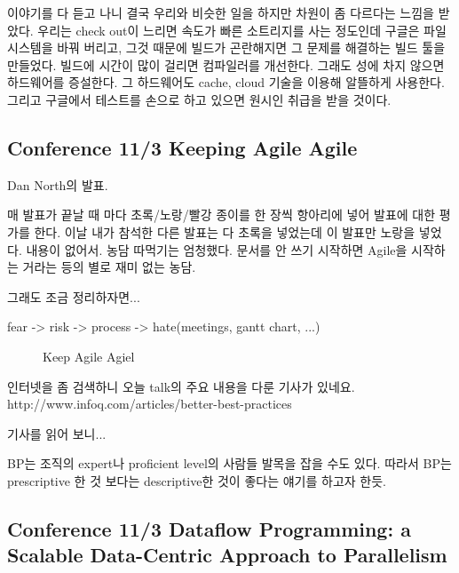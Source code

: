\documentclass[a4paper]{article}
\begin{document}
이야기를 다 듣고 나니 결국 우리와 비슷한 일을 하지만 차원이 좀 다르다는
느낌을 받았다. 우리는 check out이 느리면 속도가 빠른 소트리지를 사는
정도인데 구글은 파일시스템을 바꿔 버리고, 그것 때문에 빌드가 곤란해지면
그 문제를 해결하는 빌드 툴을 만들었다. 빌드에 시간이 많이 걸리면
컴파일러를 개선한다. 그래도 성에 차지 않으면 하드웨어를 증설한다. 그
하드웨어도 cache, cloud 기술을 이용해 알뜰하게 사용한다. 그리고
구글에서 테스트를 손으로 하고 있으면 원시인 취급을 받을 것이다.

\subsection{Conference 11/3 Keeping Agile Agile}
 
Dan North의 발표.  

매 발표가 끝날 때 마다 초록/노랑/빨강 종이를 한 장씩 항아리에 넣어
발표에 대한 평가를 한다.  이날 내가 참석한 다른 발표는 다 초록을
넣었는데 이 발표만 노랑을 넣었다.  내용이 없어서. 농담 따먹기는 엄청했다. 
문서를 안 쓰기 시작하면 Agile을 시작하는 거라는 등의 별로 재미 없는 농담.
 
그래도 조금 정리하자면...

\begin{center}
fear -> risk -> process -> hate(meetings, gantt chart, ...)
\end{center}

\begin{figure}[t]
    \begin{Frame}
        \begin{center}
        \end{center}
    \end{Frame}
    \caption{Keep Agile Agiel}
    \label{agile agile}
\end{figure}

인터넷을 좀 검색하니 오늘 talk의 주요 내용을 다룬 기사가 있네요.
http://www.infoq.com/articles/better-best-practices
 
기사를 읽어 보니...

BP는 조직의 expert나 proficient level의 사람들 발목을 잡을 수도 있다.
따라서 BP는 prescriptive 한 것 보다는 descriptive한 것이 좋다는 얘기를
하고자 한듯.
 
\subsection{Conference 11/3 Dataflow Programming: a Scalable
  Data-Centric Approach to Parallelism}
 
\end{document}
